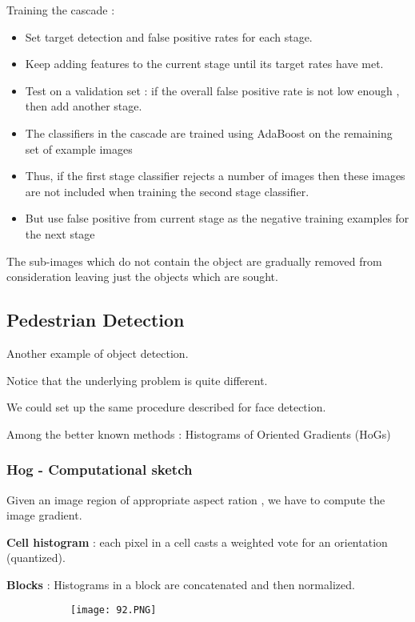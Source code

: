 \documentclass{article}
\begin{document}
Training the cascade : 

\begin{itemize}
    \item Set target detection and false positive rates for each stage.
    \item Keep adding features to the current stage until its target rates have met.
    \item Test on a validation set : if the overall false positive rate is not low enough , then add another stage.
    \item The classifiers in the cascade are trained using AdaBoost on the remaining set of example images
    \item Thus, if the first stage classifier rejects a number of images then these images are not included when training the second stage classifier.
    \item But use false positive from current stage as the negative training examples for the next stage
\end{itemize}

The sub-images which do not contain the object are gradually removed from consideration leaving just the objects which are sought.


\subsection{Pedestrian Detection}

Another example of object detection.

Notice that the underlying problem is quite different.

We could set up the same procedure described for face detection.

Among the better known methods : Histograms of Oriented Gradients (HoGs)

\subsubsection{Hog - Computational sketch}

Given an image region of appropriate aspect ration , we have to compute the image gradient.

\textbf{Cell histogram} : each pixel in a cell casts a weighted vote for an orientation (quantized).

\textbf{Blocks} : Histograms in a block are concatenated and then normalized.

\begin{figure}[ht!]
  \centering
  \begin{subfigure}[b]{0.7\linewidth}
    \texttt{[image: 92.PNG]}
  \end{subfigure}
\end{figure}
\end{document}
